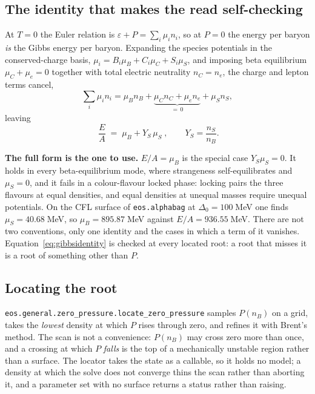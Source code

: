 \documentclass[11pt,a4paper]{article}
\begin{document}
\subsection{The identity that makes the read self-checking}

At $T = 0$ the Euler relation is $\varepsilon + P = \sum_i \mu_i n_i$, so at
$P = 0$ the energy per baryon \emph{is} the Gibbs energy per baryon. Expanding
the species potentials in the conserved-charge basis,
$\mu_i = B_i\mu_B + C_i\mu_C + S_i\mu_S$, and imposing beta equilibrium
$\mu_C + \mu_e = 0$ together with total electric neutrality $n_C = n_e$, the
charge and lepton terms cancel,
%
\begin{equation}
  \sum_i \mu_i n_i
    = \mu_B n_B + \underbrace{\mu_C n_C + \mu_e n_e}_{=\,0} + \mu_S n_S ,
\end{equation}
%
leaving
%
\begin{equation}
  \boxed{\;\frac{E}{A} \;=\; \mu_B + Y_S\,\mu_S\;} ,
  \qquad Y_S = \frac{n_S}{n_B} .
  \label{eq:gibbsidentity}
\end{equation}

\textbf{The full form is the one to use.} $E/A = \mu_B$ is the special case
$Y_S\mu_S = 0$. It holds in every beta-equilibrium mode, where strangeness
self-equilibrates and $\mu_S = 0$, and it fails in a colour-flavour locked
phase: locking pairs the three flavours at equal densities, and equal densities
at unequal masses require unequal potentials. On the CFL surface of
\texttt{eos.alphabag} at $\Delta_0 = 100\;$MeV one finds
$\mu_S = 40.68\;$MeV, so $\mu_B = 895.87\;$MeV against
$E/A = 936.55\;$MeV. There are not two conventions, only one identity and the
cases in which a term of it vanishes. Equation~\eqref{eq:gibbsidentity} is
checked at every located root: a root that misses it is a root of something
other than $P$.

\subsection{Locating the root}

\texttt{eos.general.zero\_pressure.locate\_zero\_pressure} samples $P(n_B)$ on
a grid, takes the \emph{lowest} density at which $P$ rises through zero, and
refines it with Brent's method. The scan is not a convenience: $P(n_B)$ may
cross zero more than once, and a crossing at which $P$ \emph{falls} is the top
of a mechanically unstable region rather than a surface. The locator takes the
state as a callable, so it holds no model; a density at which the solve does
not converge thins the scan rather than aborting it, and a parameter set with
no surface returns a status rather than raising.
\end{document}
